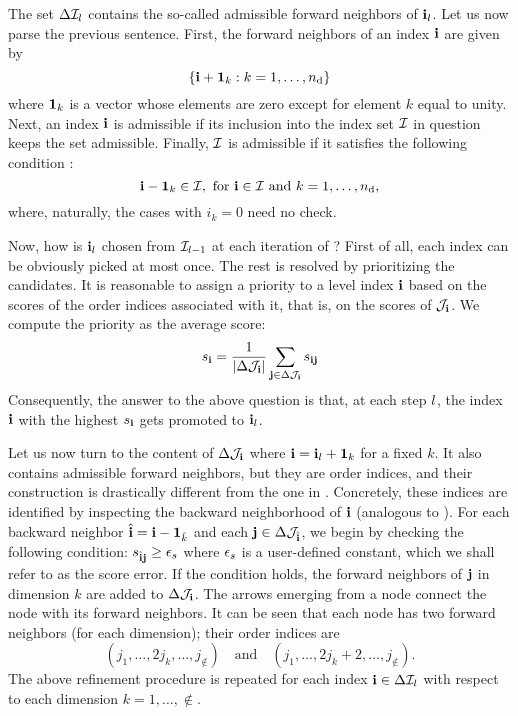 The set $\Delta\mathcal{I}_l$ contains the so-called admissible forward neighbors
of $\mathbf{i}_l$. Let us now parse the previous sentence. First, the forward
neighbors of an index $\mathbf{i}$ are given by
\begin{equation} \elab{forward-level-neighbors}
  \left\{ \vi + \v{1}_k: k = 1, \dots, \nin \right\}
\end{equation}
where $\mathbf{1}_k$ is a vector whose elements are zero except for element $k$ equal
to unity. Next, an index $\mathbf{i}$ is admissible if its inclusion into the index set
$\mathcal{I}$ in question keeps the set admissible. Finally, $\mathcal{I}$ is admissible
if it satisfies the following condition \cite{klimke2006}:
\begin{equation} \elab{admissibility}
  \vi - \v{1}_k \in \lindex, \text{ for $\vi \in \lindex$ and $k = 1, \dots, \nin$,}
\end{equation}
where, naturally, the cases with $i_k = 0$ need no check.

Now, how is $\mathbf{i}_l$ chosen from $\mathcal{I}_{l-1}$ at each iteration of
? First of all, each index can be obviously picked at most
once. The rest is resolved by prioritizing the candidates. It is reasonable to
assign a priority to a level index $\mathbf{i}$ based on the scores of the order
indices associated with it, that is, on the scores of $\mathcal{J}_{\mathbf{i}}$. We compute
the priority as the average score:
\[
  s_{\mathbf{i}} = \frac{1}{\left| \Delta\mathcal{J}_{\mathbf{i}} \right|} \sum_{\mathbf{j} \in \Delta\mathcal{J}_{\mathbf{i}}} s_{\mathbf{i}\mathbf{j}}
\]
Consequently, the answer to the above question is that, at each step $l$, the
index $\mathbf{i}$ with the highest $s_{\mathbf{i}}$ gets promoted to $\mathbf{i}_l$.

Let us now turn to the content of $\Delta\mathcal{J}_{\mathbf{i}}$ where $\mathbf{i} = \mathbf{i}_l +
\mathbf{1}_k$ for a fixed $k$. It also contains admissible forward neighbors, but
they are order indices, and their construction is drastically different from the
one in . Concretely, these indices are identified
by inspecting the backward neighborhood of $\mathbf{i}$ (analogous to
). For each backward neighbor $\hat{\mathbf{i}} = \mathbf{i} -
\mathbf{1}_{\hat{k}}$ and each $\mathbf{j} \in \Delta\mathcal{J}_{\hat{\mathbf{i}}}$, we begin by
checking the following condition: $s_{\hat{\mathbf{i}}\mathbf{j}} \geq \epsilon_s$ where
$\epsilon_s$ is a user-defined constant, which we shall refer to as the score
error. If the condition holds, the forward neighbors of $\mathbf{j}$ in dimension $k$
are added to $\Delta\mathcal{J}_{\mathbf{i}}$.  The arrows
emerging from a node connect the node with its forward neighbors. It can be seen
that each node has two forward neighbors (for each dimension); their order
indices are
\[
  (j_1, \dots, 2 j_k, \dots, j_\nin) \hspace{1em} \text{and} \hspace{1em} (j_1, \dots, 2 j_k + 2, \dots, j_\nin).
\]
The above refinement procedure is repeated for each index $\mathbf{i} \in
\Delta\mathcal{I}_l$ with respect to each dimension $k = 1, \dots, \nin$.

